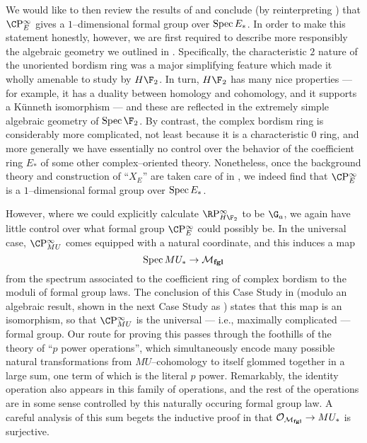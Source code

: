 We would like to then review the results of  and conclude (by reinterpreting ) that $\CP^\infty_E$ gives a $1$--dimensional formal group over $\operatorname{Spec} E_*$.  In order to make this statement honestly, however, we are first required to describe more responsibly the algebraic geometry we outlined in .  Specifically, the characteristic $2$ nature of the unoriented bordism ring was a major simplifying feature which made it wholly amenable to study by $H\F_2$.  In turn, $H\F_2$ has many nice properties --- for example, it has a duality between homology and cohomology, and it supports a K\"unneth isomorphism --- and these are reflected in the extremely simple algebraic geometry of $\Spec \F_2$.  By contrast, the complex bordism ring is considerably more complicated, not least because it is a characteristic $0$ ring, and more generally we have essentially no control over the behavior of the coefficient ring $E_*$ of some other complex--oriented theory.  Nonetheless, once the background theory and construction of ``$X_E$'' are taken care of in , we indeed find that $\CP^\infty_E$ is a $1$--dimensional formal group over $\operatorname{Spec} E_*$.

However, where we could explicitly calculate $\RP^\infty_{H\F_2}$ to be $\G_a$, we again have little control over what formal group $\CP^\infty_E$ could possibly be.  In the universal case, $\CP^\infty_{MU}$ comes equipped with a natural coordinate, and this induces a map \[\operatorname{Spec} MU_* \to \mathcal{M}_{\mathbf{fgl}}\] from the spectrum associated to the coefficient ring of complex bordism to the moduli of formal group laws.  The conclusion of this Case Study in  (modulo an algebraic result, shown in the next Case Study as ) states that this map is an isomorphism, so that $\CP^\infty_{MU}$ is the universal --- i.e., maximally complicated --- formal group.  Our route for proving this passes through the foothills of the theory of ``$p${\th} power operations'', which simultaneously encode many possible natural transformations from $MU$--cohomology to itself glommed together in a large sum, one term of which is the literal $p${\th} power.  Remarkably, the identity operation also appears in this family of operations, and the rest of the operations are in some sense controlled by this naturally occuring formal group law.  A careful analysis of this sum begets the inductive proof in  that $\mathcal{O}_{\mathcal{M}_{\mathbf{fgl}}} \to MU_*$ is surjective.

